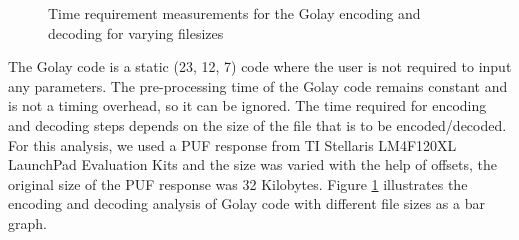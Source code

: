 \begin{figure}[h]
\centering
{}
\caption{Time requirement measurements for the Golay encoding and decoding for varying filesizes}
\label{img:golay_time}
\end{figure}
The Golay code is a static (23, 12, 7) code where the user is not required to input any parameters. The pre-processing time of the Golay code remains constant and is not a timing overhead, so it can be ignored. The time required for encoding and decoding steps depends on the size of the file that is to be encoded/decoded. For this analysis, we used a PUF response from TI Stellaris LM4F120XL LaunchPad Evaluation Kits and the size was varied with the help of offsets, the original size of
the PUF response was 32 Kilobytes. Figure \ref{img:golay_time} illustrates the encoding and decoding analysis of Golay code with different file sizes as a bar graph.\\
